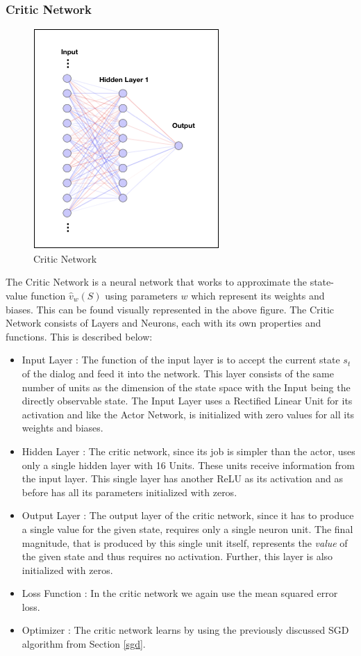 \documentclass[12pt]{extarticle}
\numberwithin{equation}{section}
\begin{document}
	\subsubsection{Critic Network}
	\begin{figure}[h]
		\vspace{0.2cm}
		\centering
		\includegraphics[scale=0.6]{nn-critic}
		\caption{Critic Network
			\label{nn-critic}}
	\end{figure}
	The Critic Network is a neural network that works to approximate the state-value function $\hat{v}_w(S)$ using parameters $w$ which represent its weights and biases. This can be found visually represented in the above figure. The Critic Network consists of Layers and Neurons, each with its own properties and functions. This is described below:
	\begin{itemize}
		\item Input Layer : The function of the input layer is to accept the current state $s_t$ of the dialog and feed it into the network. This layer consists of the same number of units as the dimension of the state space with the Input being the directly observable state. The Input Layer uses a Rectified Linear Unit for its activation and like the Actor Network, is initialized with zero values for all its weights and biases.
		\item Hidden Layer : The critic network, since its job is simpler than the actor, uses only a single hidden layer with 16 Units. These units receive information from the input layer. This single layer has another ReLU as its activation and as before has all its parameters initialized with zeros.
		\item Output Layer : The output layer of the critic network, since it has to produce a single value for the given state, requires only a single neuron unit. The final magnitude, that is produced by this single unit itself, represents the \textit{value} of the given state and thus requires no activation. Further, this layer is also initialized with zeros.
		\item Loss Function : In the critic network we again use the mean squared error loss.
		\item Optimizer : The critic network learns by using the previously discussed SGD algorithm from Section \ref{sgd}.
	\end{itemize}
	
\end{document}
